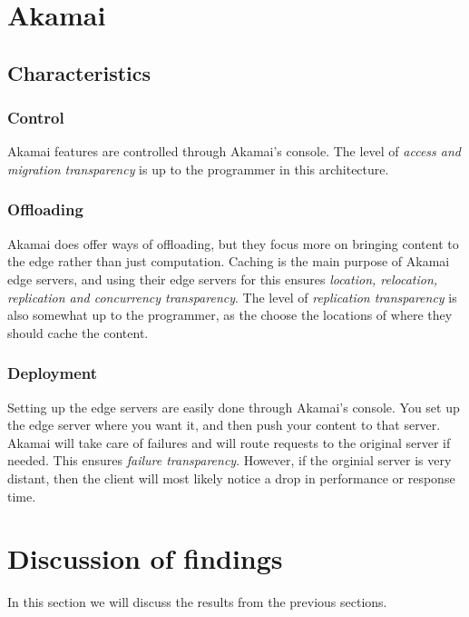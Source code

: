 




\section{Akamai}
\subsection{Characteristics}
\subsubsection{Control}
Akamai features are controlled through Akamai's console. The level of \textit{access and migration transparency} is up to the programmer in this architecture.

\subsubsection{Offloading}
Akamai does offer ways of offloading, but they focus more on bringing content to the edge rather than just computation. Caching is the main purpose of Akamai edge servers, and using their edge servers for this ensures \textit{location, relocation, replication and concurrency transparency}. The level of \textit{replication transparency} is also somewhat up to the programmer, as the choose the locations of where they should cache the content.

\subsubsection{Deployment}
Setting up the edge servers are easily done through Akamai's console. You set up the edge server where you want it, and then push your content to that server. Akamai will take care of failures and will route requests to the original server if needed. This ensures \textit{failure transparency}. However, if the orginial server is very distant, then the client will most likely notice a drop in performance or response time.






\section{Discussion of findings}
In this section we will discuss the results from the previous sections. 

